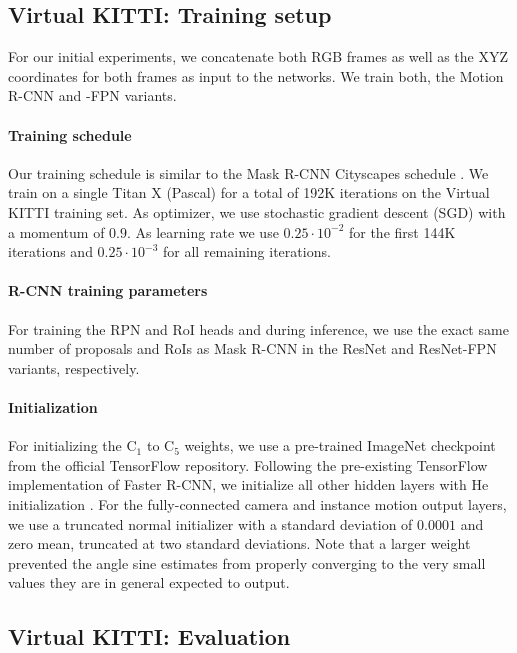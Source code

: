 \subsection{Virtual KITTI: Training setup}
\label{ssec:setup}

For our initial experiments, we concatenate both RGB frames as
well as the XYZ coordinates for both frames as input to the networks.
We train both, the Motion R-CNN  and -FPN variants.

\paragraph{Training schedule}
Our training schedule is similar to the Mask R-CNN Cityscapes schedule \cite{MaskRCNN}.
We train on a single Titan X (Pascal) for a total of 192K iterations on the
Virtual KITTI training set.
As optimizer, we use stochastic gradient descent (SGD) \cite{SGD} with a
momentum of $0.9$.
As learning rate we use $0.25 \cdot 10^{-2}$ for the
first 144K iterations and $0.25 \cdot 10^{-3}$ for all remaining iterations.

\paragraph{R-CNN training parameters}
For training the RPN and RoI heads and during inference,
we use the exact same number of proposals and RoIs as Mask R-CNN in
the ResNet and ResNet-FPN variants, respectively.

\paragraph{Initialization}
For initializing the  C$_1$ to C$_5$ weights, we use a pre-trained
ImageNet \cite{ImageNet} checkpoint from the official TensorFlow repository.
Following the pre-existing TensorFlow implementation of Faster R-CNN,
we initialize all other hidden layers with He initialization \cite{He}.
For the fully-connected camera and instance motion output layers,
we use a truncated normal initializer with a standard
deviation of $0.0001$ and zero mean, truncated at two standard deviations.
Note that a larger weight prevented the
angle sine estimates from properly converging to the very small values they
are in general expected to output.

\subsection{Virtual KITTI: Evaluation}
\label{ssec:vkitti}

